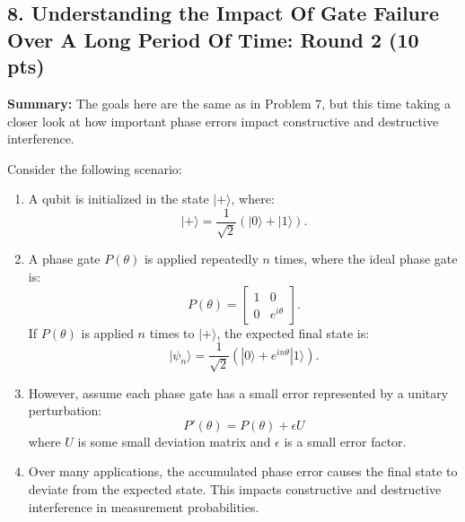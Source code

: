 \documentclass[12pt]{article}
\begin{document}
\subsection*{8. Understanding the Impact Of Gate Failure Over A Long Period Of Time: Round 2 (10 pts)}
\textbf{Summary:} The goals here are the same as in Problem 7, but this time taking a closer look at how important phase errors impact constructive and destructive interference.

Consider the following scenario:

\begin{enumerate}
    \item A qubit is initialized in the state \( |+\rangle \), where:
    \[
    |+\rangle = \frac{1}{\sqrt{2}} (|0\rangle + |1\rangle).
    \]
    \item A phase gate \( P(\theta) \) is applied repeatedly \( n \) times, where the ideal phase gate is:
    \[
    P(\theta) = \begin{bmatrix} 1 & 0 \\ 0 & e^{i\theta} \end{bmatrix}.
    \]
    If \( P(\theta) \) is applied \( n \) times to \( |+\rangle \), the expected final state is:
    \[
    |\psi_n\rangle = \frac{1}{\sqrt{2}} (|0\rangle + e^{in\theta} |1\rangle).
    \]
    \item However, assume each phase gate has a small error represented by a unitary perturbation:
    \[
    P'(\theta) = P(\theta) + \epsilon U
    \]
    where \( U \) is some small deviation matrix and \( \epsilon \) is a small error factor.
    \item Over many applications, the accumulated phase error causes the final state to deviate from the expected state. This impacts constructive and destructive interference in measurement probabilities.
\end{enumerate}
\end{document}
